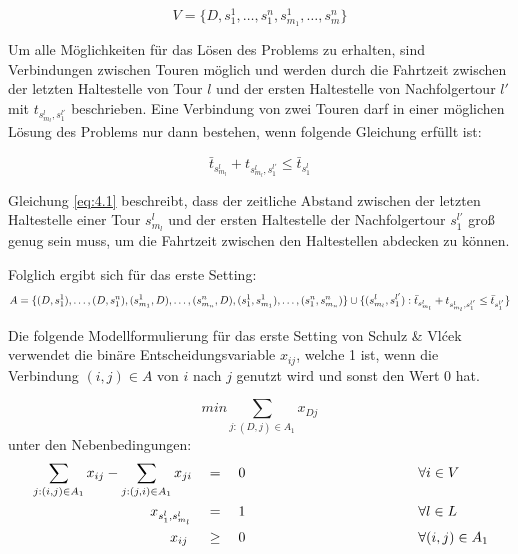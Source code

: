 \[
V = \{ D, s^1_1, \dots, s^n_1, s^1_{m_1}, \dots, s^n_m \}
\]

Um alle Möglichkeiten für das Lösen des Problems zu erhalten, sind Verbindungen zwischen Touren möglich und werden durch die Fahrtzeit zwischen der letzten Haltestelle von Tour $l$ und der ersten Haltestelle von Nachfolgertour $l'$ mit $t_{s^l_{m_l}, s^{l'}_1}$ beschrieben. Eine Verbindung von zwei Touren darf in einer möglichen Lösung des Problems nur dann bestehen, wenn folgende Gleichung erfüllt ist: 

\begin{equation}
    \label{eq:4.1}
    \bar{t}_{s^l_{m_l}} + t_{s^l_{m_l}, s^{l'}_1} \leq \bar{t}_{s^{l}_1}
\end{equation}

Gleichung \ref{eq:4.1} beschreibt, dass der zeitliche Abstand zwischen der letzten Haltestelle einer Tour $s^l_{m_l}$ und der ersten Haltestelle der Nachfolgertour $s^{l'}_1$ groß genug sein muss, um die Fahrtzeit zwischen den Haltestellen abdecken zu können.

Folglich ergibt sich für das erste Setting:
\[
A = \{(D, s_1^1), \ldots, (D, s_1^n), (s_{m_1}^1, D), \ldots, (s_{m_n}^n, D), (s_1^1, s_{m_1}^1), \ldots, (s_1^n, s_{m_n}^n)\}   \\   
\cup \{(s_{m_l}^l, s_1^{l'}) : \bar{t}_{s_{m_l}^l} + t_{s_{m_l}^l, s_1^{l'}} \leq \bar{t}_{s_1^{l'}}\}
\]

Die folgende Modellformulierung für das erste Setting von Schulz \& Vlćek verwendet die binäre Entscheidungsvariable $x_{ij}$, welche 1 ist, wenn die Verbindung $(i,j) \in A$ von $i$ nach $j$  genutzt wird und sonst den Wert 0 hat.

\begin{equation}
    min \sum_{j:(D,j) \in A_1} x_{Dj}
\label{eq:4.2}
\end{equation}
unter den Nebenbedingungen:
\begin{alignat}{3}
    &\sum_{j:(i,j) \in A_1} x_{ij} - \sum_{j:(j,i) \in A_1} x_{ji} &&= \quad 0 \hspace{4cm} &&\forall i \in V \label{eq:4.3}\\
    &\hspace{3cm} x_{s_1^l, s_{m_l}^l} &&= \quad 1\hspace{4cm} &&\forall l \in L\label{eq:4.4}\\
    &\hspace{3.5cm} x_{ij} &&\geq \quad 0 \hspace{4cm}&&\forall (i,j) \in A_1\label{eq:4.5}
\end{alignat}

